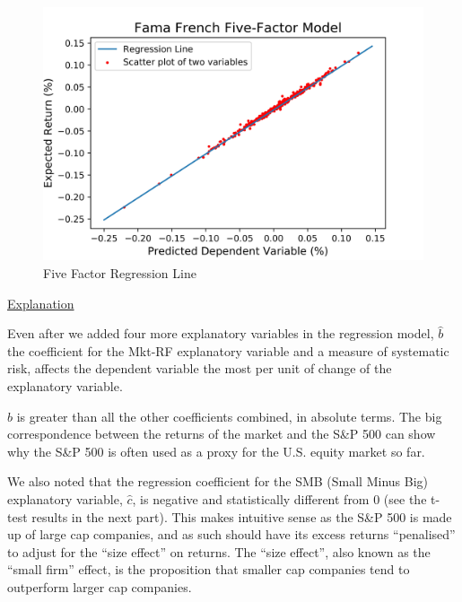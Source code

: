 \documentclass[a4paper]{article}
\begin{document}
\newpage
\begin{figure}[ht]
	\centering
	\includegraphics[width=\linewidth, frame]{FF_regression.jpeg}
	\captionsetup{font=small}
	\caption{Five Factor Regression Line}
\end{figure}

\underline{Explanation}

Even after we added four more explanatory variables in the regression model, $\hat{b}$ the coefficient for the Mkt-RF explanatory variable and a measure of systematic risk, affects the dependent variable the most per unit of change of the explanatory variable. 

$\hat{b}$ is greater than all the other coefficients combined, in absolute terms. The big correspondence between the returns of the market and the S\&P 500 can show why the S\&P 500 is often used as a proxy for the U.S. equity market so far.

We also noted that the regression coefficient for the SMB (Small Minus Big) explanatory variable, $\hat{c}$, is negative and statistically different from 0 (see the t-test results in the next part). This makes intuitive sense as the S\&P 500 is made up of large cap companies, and as such should have its excess returns “penalised” to adjust for the “size effect” on returns. The “size effect”, also known as the “small firm” effect, is the proposition that smaller cap companies tend to outperform larger cap companies.
\end{document}
